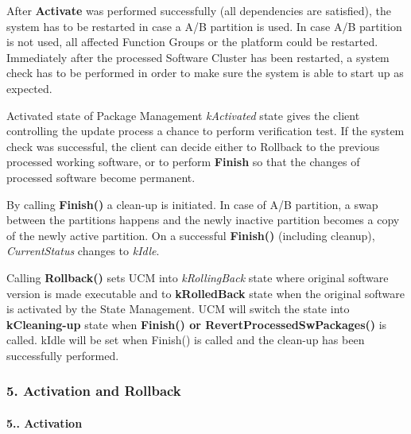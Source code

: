 \begin{DoxyItemize}
After {\bfseries Activate} was performed successfully (all dependencies are satisfied), the system has to be restarted in case a A/B partition is used. In case A/B partition is not used, all affected Function Groups or the platform could be restarted. Immediately after the processed Software Cluster has been restarted, a system check has to be performed in order to make sure the system is able to start up as expected. 
\item Activated state of Package Management {\itshape k\+Activated} state gives the client controlling the update process a chance to perform verification test. If the system check was successful, the client can decide either to Rollback to the previous processed working software, or to perform {\bfseries Finish} so that the changes of processed software become permanent.
\item By calling {\bfseries Finish()} a clean-\/up is initiated. In case of A/B partition, a swap between the partitions happens and the newly inactive partition becomes a copy of the newly active partition. On a successful {\bfseries Finish()} (including cleanup), {\itshape Current\+Status} changes to {\itshape k\+Idle}.
\item Calling {\bfseries Rollback()} sets U\+CM into {\itshape k\+Rolling\+Back} state where original software version is made executable and to {\bfseries k\+Rolled\+Back} state when the original software is activated by the State Management. U\+CM will switch the state into {\bfseries k\+Cleaning-\/up} state when {\bfseries Finish() or Revert\+Processed\+Sw\+Packages()} is called. k\+Idle will be set when Finish() is called and the clean-\/up has been successfully performed.
\end{DoxyItemize}

\subsubsection*{5. Activation and Rollback}

\paragraph*{5.. Activation}


